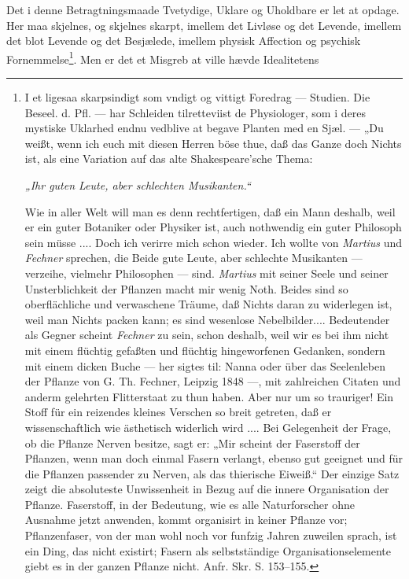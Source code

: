 \documentclass[11pt]{book}
\newcommand{\opage}[1]{\marginnote{\footnotesize\textit{[#1]}}}
\begin{document}
Det i denne Betragtningsmaade Tvetydige, Uklare og Uholdbare er let at
opdage. Her maa skjelnes, og skjelnes skarpt, imellem det Livløse og det
Levende, imellem det blot Levende og det Besjælede, imellem physisk Affection
og psychisk
\opage{334} \setcounter{footnote}{0}%
Fornemmelse\footnote{%
I et ligesaa skarpsindigt som vndigt og vittigt Foredrag ---
Studien. Die Beseel. d. Pfl. --- har Schleiden tilretteviist de Physiologer,
som i deres mystiske Uklarhed endnu vedblive at begave Planten med en Sjæl.
--- „Du weißt, wenn ich euch mit diesen Herren böse thue, daß das Ganze doch
Nichts ist, als eine Variation auf das alte Shakespeare'sche Thema:\par
\emph{„Ihr guten Leute, aber schlechten Musikanten.“}\par\noindent
Wie in aller Welt will man es denn rechtfertigen, daß ein Mann deshalb, weil
er ein guter Botaniker oder Physiker ist, auch nothwendig ein guter Philosoph
sein müsse .... Doch ich verirre mich schon wieder. Ich wollte von
\emph{Martius} und \emph{Fechner} sprechen, die Beide gute Leute, aber
schlechte Musikanten --- verzeihe, vielmehr Philosophen --- sind.
\emph{Martius} mit seiner Seele und seiner Unsterblichkeit der Pflanzen macht
mir wenig Noth. Beides sind so oberflächliche und verwaschene Träume, daß
Nichts daran zu widerlegen ist, weil man Nichts packen kann; es sind
wesenlose Nebelbilder.... Bedeutender als Gegner scheint \emph{Fechner} zu
sein, schon deshalb, weil wir es bei ihm nicht mit einem flüchtig gefaßten
und flüchtig hingeworfenen Gedanken, sondern mit einem dicken Buche --- her
sigtes til: Nanna oder über das Seelenleben der Pflanze von G. Th. Fechner,
Leipzig 1848 ---, mit zahlreichen Citaten und anderm gelehrten Flitterstaat
zu thun haben. Aber nur um so trauriger! Ein Stoff für ein reizendes kleines
Verschen so breit getreten, daß er wissenschaftlich wie ästhetisch widerlich
wird .... Bei Gelegenheit der Frage, ob die Pflanze Nerven besitze, sagt er:
„Mir scheint der Faserstoff der Pflanzen, wenn man doch einmal Fasern
verlangt, ebenso gut geeignet und für die Pflanzen passender zu Nerven, als
das thierische Eiweiß.“ Der einzige Satz zeigt die absoluteste Unwissenheit
in Bezug auf die innere Organisation der Pflanze. Faserstoff, in der
Bedeutung, wie es alle Naturforscher ohne Ausnahme jetzt anwenden, kommt
organisirt in keiner Pflanze vor; Pflanzenfaser, von der man wohl noch vor
funfzig Jahren zuweilen sprach, ist ein Ding, das nicht existirt; Fasern als
selbstständige Organisationselemente giebt es in der ganzen Pflanze nicht.
Anfr. Skr. S. 153--155.}. Men er det et Misgreb at ville hævde Idealitetens
\end{document}
